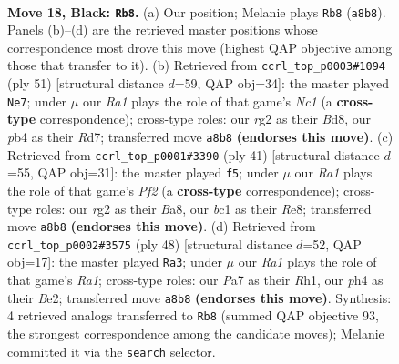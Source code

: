 \documentclass[11pt]{article}
\begin{document}
\clearpage

\begin{figure}[p]\centering
\begin{subfigure}{0.46\textwidth}\centering
\resizebox{\linewidth}{!}{%
\newchessgame
\chessboard[
  setfen={r1b1kb1r/p1p2p1p/2p3p1/2P5/PP3P1P/8/6R1/RNB1K3 b Q - 0 18},
  showmover=false,
  pgfstyle=straightmove, color=movearrow, markmove={a8-b8}
]}
\caption{}
\end{subfigure}\hfill
\begin{subfigure}{0.46\textwidth}\centering
\resizebox{\linewidth}{!}{%
\newchessgame
\chessboard[
  setfen={2nb4/1p1r1k1p/p5pB/3p1p2/3P3P/P2K2P1/1P3PB1/3R4 b - - 3 26},
  showmover=false,
  pgfstyle=straightmove, color=movearrow, markmove={c8-e7}
]}
\caption{}
\end{subfigure}
\\[4pt]
\begin{subfigure}{0.46\textwidth}\centering
\resizebox{\linewidth}{!}{%
\newchessgame
\chessboard[
  setfen={b3r1k1/p4pbp/3p2p1/2p5/5P2/PP6/2PK1BPP/5BR1 b - - 1 21},
  showmover=false,
  pgfstyle=straightmove, color=movearrow, markmove={f7-f5}
]}
\caption{}
\end{subfigure}\hfill
\begin{subfigure}{0.46\textwidth}\centering
\resizebox{\linewidth}{!}{%
\newchessgame
\chessboard[
  setfen={rnr5/pp2kpp1/7p/2n1p2P/P3P1P1/2P2P2/3KB3/R5BR w - - 2 25},
  showmover=false,
  pgfstyle=straightmove, color=movearrow, markmove={a1-a3}
]}
\caption{}
\end{subfigure}
\caption{\textbf{Move 18, Black: \texttt{Rb8}.} (a) Our position; Melanie plays \texttt{Rb8} (\texttt{a8b8}). Panels (b)--(d) are the retrieved master positions whose correspondence most drove this move (highest QAP objective among those that transfer to it). (b) Retrieved from \texttt{ccrl\_top\_p0003\#1094} (ply 51) [structural distance $d$=59, QAP obj=34]: the master played \texttt{Ne7}; under $\mu$ our \emph{Ra1} plays the role of that game's \emph{Nc1} (a \textbf{cross-type} correspondence); cross-type roles: our \emph{r}g2 as their \emph{B}d8, our \emph{p}b4 as their \emph{R}d7; transferred move \texttt{a8b8} \textbf{(endorses this move)}. (c) Retrieved from \texttt{ccrl\_top\_p0001\#3390} (ply 41) [structural distance $d$=55, QAP obj=31]: the master played \texttt{f5}; under $\mu$ our \emph{Ra1} plays the role of that game's \emph{Pf2} (a \textbf{cross-type} correspondence); cross-type roles: our \emph{r}g2 as their \emph{B}a8, our \emph{b}c1 as their \emph{R}e8; transferred move \texttt{a8b8} \textbf{(endorses this move)}. (d) Retrieved from \texttt{ccrl\_top\_p0002\#3575} (ply 48) [structural distance $d$=52, QAP obj=17]: the master played \texttt{Ra3}; under $\mu$ our \emph{Ra1} plays the role of that game's \emph{Ra1}; cross-type roles: our \emph{P}a7 as their \emph{R}h1, our \emph{p}h4 as their \emph{B}e2; transferred move \texttt{a8b8} \textbf{(endorses this move)}. Synthesis: 4 retrieved analogs transferred to \texttt{Rb8} (summed QAP objective 93, the strongest correspondence among the candidate moves); Melanie committed it via the \texttt{search} selector.}
\label{fig:thought-m35}
\end{figure}
\end{document}

